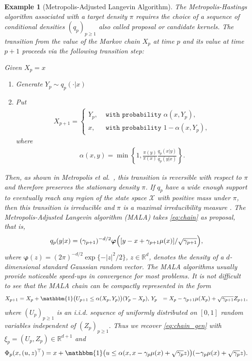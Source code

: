 \documentclass[bj]{imsart}
\newtheorem{example}{Example}
\begin{document}
\begin{example}[Metropolis-Adjusted Langevin Algorithm]
The Metropolis-Hastings algorithm
associated with a target density \(\pi\) requires the choice of a sequence of conditional densities  \((q_p)_{p\geq 1}\) also called proposal or candidate kernels. The transition from the value  of the Markov chain \(X_p\)  at time \(p\)
and its value at time \(p + 1\) proceeds via the following transition step:

\begin{algorithm}[H]
Given \(X_p=x\)\;
\begin{enumerate}
\item Generate \(Y_p\sim q_p(\cdot|x)\)\;
\item Put
\begin{eqnarray*}
X_{p+1}=
\begin{cases}
Y_p, & \texttt{ with probability } \alpha(x,Y_p),
\\
x, &  \texttt{ with probability } 1-\alpha(x,Y_p),
\end{cases}
\end{eqnarray*}
where
\begin{eqnarray*}
\alpha(x,y)=\min\left\{1,\frac{\pi(y)}{\pi(x)}\frac{q_p(x|y)}{q_p(y|x)}\right\}.
\end{eqnarray*}
\end{enumerate}
\end{algorithm}
Then, as shown in Metropolis et al.~\cite{metropolis1953equation}, this transition is reversible with respect to \(\pi\) and therefore preserves the stationary density \(\pi\). If \(q_p\) have a wide enough
support to eventually reach any region
of the state space \(\mathcal{X}\) with positive mass
under \(\pi\), then this transition is irreducible and $\pi$ is a maximal irreducibility measure \cite{mengersen:tweedie:1996}. The  Metropolis-Adjusted Langevin algorithm (MALA) takes  \eqref{eq:chain} as proposal, that is,
\begin{eqnarray*}
q_p(y|x)=(\gamma_{p+1})^{-d/2}\boldsymbol{\varphi}\Bigl([y-x+\gamma_{p+1}\mu(x)]/\sqrt{\gamma_{p+1}}\Bigr),
\end{eqnarray*}
where
$\boldsymbol{\varphi}(z)=(2\pi)^{-d/2} \exp\{-|z|^2/2\}$,
$z\in\mathbb R^d$, denotes the density of a $d$-dimensional
standard Gaussian random vector.  The MALA algorithms usually provide noticeable speed-ups in convergence for most problems. It is not difficult to see that the MALA chain can be compactly represented in the form
\begin{align*}
X_{p+1} &=X_p+\mathbbm{1}\bigl(U_{p+1}\leq \alpha(X_{p},Y_{p})\bigr)(Y_{p}-X_p),  \,
Y_{p}&=X_p-\gamma_{p+1}\mu(X_p)+\sqrt{\gamma_{p+1}}Z_{p+1},
\end{align*}
where \((U_{p})_{p\geq 1}\) is an i.i.d. sequence of uniformly distributed on \([0,1]\) random variables independent of \((Z_p)_{p\geq 1}.\) Thus we recover \eqref{eq:chain_gen} with  \(\xi_p=(U_p,Z_p)\in \mathbb{R}^{d+1}\) and
\begin{eqnarray*}
\Phi_p(x,(u,z)^\top)=x+\mathbbm{1}\bigl(u\leq \alpha(x,x-\gamma_{p}\mu(x)+\sqrt{\gamma_{p}}z)\bigr)(-\gamma_{p}\mu(x)+\sqrt{\gamma_{p}}z).
\end{eqnarray*}
\end{example}
\end{document}
